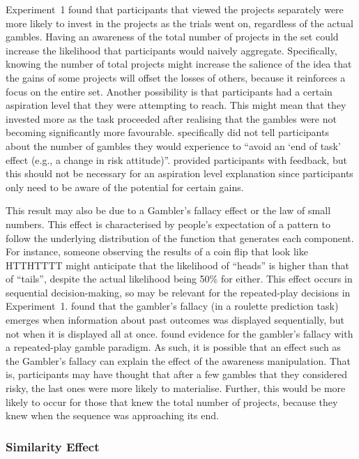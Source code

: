 \documentclass[a4paper, nobind]{templates/ociamthesis}
\theoremstyle{definition}
\theoremstyle{definition}
\theoremstyle{definition}
\theoremstyle{definition}
\theoremstyle{remark}
\begin{document}
Experiment~1 found that participants that viewed the projects separately were
more likely to invest in the projects as the trials went on, regardless of the
actual gambles. Having an awareness of the total number of projects in the set
could increase the likelihood that participants would naively aggregate.
Specifically, knowing the number of total projects might increase the salience
of the idea that the gains of some projects will offset the losses of others,
because it reinforces a focus on the entire set. Another possibility is that
participants had a certain aspiration level \autocite{lopes1996} that they were
attempting to reach. This might mean that they invested more as the task
proceeded after realising that the gambles were not becoming significantly more
favourable. \textcite[p.~219]{barron2003} specifically did not tell participants about
the number of gambles they would experience to ``avoid an `end of task' effect
(e.g., a change in risk attitude)''. \textcite{barron2003} provided participants with
feedback, but this should not be necessary for an aspiration level explanation
since participants only need to be aware of the potential for certain gains.

This result may also be due to a Gambler's fallacy effect or the law of small
numbers. This effect is characterised by people's expectation of a pattern to
follow the underlying distribution of the function that generates each
component. For instance, someone observing the results of a coin flip that look
like HTTHTTTT might anticipate that the likelihood of ``heads'' is higher than
that of ``tails'', despite the actual likelihood being 50\% for either. This effect
occurs in sequential decision-making, so may be relevant for the repeated-play
decisions in Experiment~1. \textcite{barron2010} found that the gambler's fallacy (in a
roulette prediction task) emerges when information about past outcomes was
displayed sequentially, but not when it is displayed all at once. \textcite{haisley2008}
found evidence for the gambler's fallacy with a repeated-play gamble paradigm.
As such, it is possible that an effect such as the Gambler's fallacy can explain
the effect of the awareness manipulation. That is, participants may have thought
that after a few gambles that they considered risky, the last ones were more
likely to materialise. Further, this would be more likely to occur for those
that knew the total number of projects, because they knew when the sequence was
approaching its end.

\hypertarget{similarity-discussion-aggregation-1}{%
\subsubsection{Similarity Effect}\label{similarity-discussion-aggregation-1}}
\end{document}
